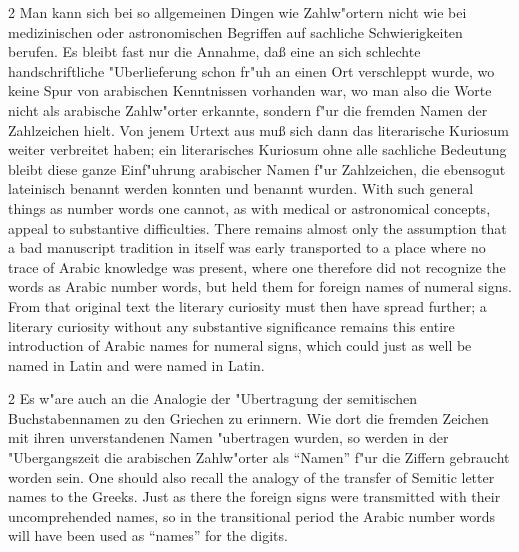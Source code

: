 \documentclass[10pt,a4paper]{article}
\renewcommand{\switchcolumn}{\syncronize\nointerlineskip\columnbreak}
\newcommand{\enquote}[1]{``#1''}
\begin{document}
\begin{paracol}{2}
Man kann sich bei so allgemeinen Dingen wie Zahlw"ortern nicht wie bei medizinischen oder astronomischen Begriffen auf sachliche Schwierigkeiten berufen. Es bleibt fast nur die Annahme, da\ss{} eine an sich schlechte handschriftliche "Uberlieferung schon fr"uh an einen Ort verschleppt wurde, wo keine Spur von arabischen Kenntnissen vorhanden war, wo man also die Worte nicht als arabische Zahlw"orter erkannte, sondern f"ur die fremden Namen der Zahlzeichen hielt. Von jenem Urtext aus mu\ss{} sich dann das literarische Kuriosum weiter verbreitet haben; ein literarisches Kuriosum ohne alle sachliche Bedeutung bleibt diese ganze Einf"uhrung arabischer Namen f"ur Zahlzeichen, die ebensogut lateinisch benannt werden konnten und benannt wurden.
\switchcolumn
With such general things as number words one cannot, as with medical or astronomical concepts, appeal to substantive difficulties. There remains almost only the assumption that a bad manuscript tradition in itself was early transported to a place where no trace of Arabic knowledge was present, where one therefore did not recognize the words as Arabic number words, but held them for foreign names of numeral signs. From that original text the literary curiosity must then have spread further; a literary curiosity without any substantive significance remains this entire introduction of Arabic names for numeral signs, which could just as well be named in Latin and were named in Latin.
\end{paracol}

\begin{paracol}{2}
Es w"are auch an die Analogie der "Ubertragung der semitischen Buchstabennamen zu den Griechen zu erinnern. Wie dort die fremden Zeichen mit ihren unverstandenen Namen "ubertragen wurden, so werden in der "Ubergangszeit die arabischen Zahlw"orter als \enquote{Namen} f"ur die Ziffern gebraucht worden sein.
\switchcolumn
One should also recall the analogy of the transfer of Semitic letter names to the Greeks. Just as there the foreign signs were transmitted with their uncomprehended names, so in the transitional period the Arabic number words will have been used as ``names'' for the digits.
\end{paracol}
\end{document}

